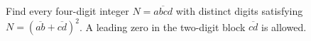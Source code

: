 Find every four-digit integer $N=\overline{abcd}$ with distinct digits satisfying $N=(\overline{ab}+\overline{cd})^2$. A leading zero in the two-digit block $\overline{cd}$ is allowed.

